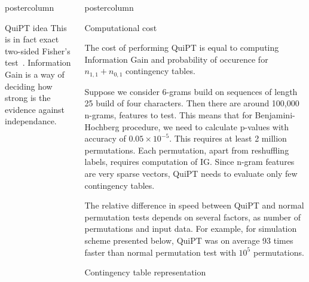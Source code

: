 \documentclass[final]{beamer}\usepackage[]{graphicx}\usepackage[]{color}
\newenvironment{knitrout}{}{} %
\newlength{\columnheight}
\begin{document}
\begin{frame}
\begin{columns}
\begin{column}{.49\textwidth}
\begin{beamercolorbox}[center,wd=\textwidth]{postercolumn}
\begin{minipage}[T]{.95\textwidth}
{\begin{block}{QuiPT idea}
This is in fact exact two-sided Fisher's test~\citep{lehmann1986testing}. 
Information Gain is a way of deciding how strong is the evidence against independance.

\end{block}
\vfill 
    
    }
        \end{minipage}
      \end{beamercolorbox}
    \end{column}
    
    
    
    \begin{column}{.52\textwidth}
      \begin{beamercolorbox}[center,wd=\textwidth]{postercolumn}
        \begin{minipage}[T]{.95\textwidth}  
          \parbox[t][\columnheight]{\textwidth}
            {
     

 
\begin{block}{Computational cost}

The cost of performing QuiPT is equal to computing Information Gain and 
probability of occurence for $n_{1,1} + n_{0,1}$ contingency tables.

Suppose we consider 6-grams build on sequences of length 25 build of four 
characters. Then there are around 100,000 n-grams, features to test. 
This means that for Benjamini-Hochberg procedure, we need to calculate 
p-values with accuracy of $0.05 \times 10^{-5}$. This requires at least 
2 million permutations. Each permutation, apart from reshuffling labels, 
requires computation of IG. Since n-gram features are very sparse vectors,
QuiPT needs to evaluate only few contingency tables.

The relative difference in speed between QuiPT and normal permutation tests depends on several factors, as number of permutations and input data. For example, for simulation scheme presented below, QuiPT was on average 93 times faster than normal permutation test with $10^5$ permutations.
\end{block}
\vfill 
    
    \begin{block}{Contingency table representation}
    
    
    \begin{columns}
    \centering
    \scalebox{0.95}{
\begin{knitrout}
\definecolor{shadecolor}{rgb}{0.969, 0.969, 0.969}\color{fgcolor}


\end{knitrout}}
\end{columns}
\end{block}}
\end{minipage}
\end{beamercolorbox}
\end{column}
\end{columns}
\end{frame}
\end{document}
